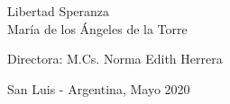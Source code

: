 \begin{center}
{\Large Libertad Speranza}\\
{\Large Mar\'ia de los  \'Angeles de la Torre}\\

\vspace{2cm}



{\Large Directora: M.Cs. Norma Edith Herrera}\\

\vspace{3cm}


{\Large  San Luis - Argentina, Mayo 2020}\\



\end{center}
